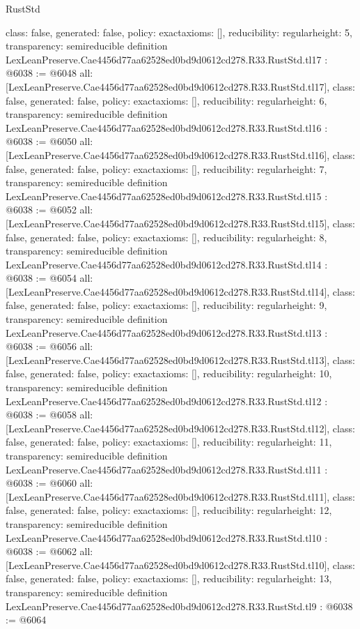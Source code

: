 \begin{lexlean}{RustStd}
\begin{coremodule}
{  class: false,
  generated: false,
  policy: exact{axioms: []},
  reducibility: regular{height: 5},
  transparency: semireducible
}
definition LexLeanPreserve.Cae4456d77aa62528ed0bd9d0612cd278.R33.RustStd.tl17 : @6038 := @6048 {
  all: [LexLeanPreserve.Cae4456d77aa62528ed0bd9d0612cd278.R33.RustStd.tl17],
  class: false,
  generated: false,
  policy: exact{axioms: []},
  reducibility: regular{height: 6},
  transparency: semireducible
}
definition LexLeanPreserve.Cae4456d77aa62528ed0bd9d0612cd278.R33.RustStd.tl16 : @6038 := @6050 {
  all: [LexLeanPreserve.Cae4456d77aa62528ed0bd9d0612cd278.R33.RustStd.tl16],
  class: false,
  generated: false,
  policy: exact{axioms: []},
  reducibility: regular{height: 7},
  transparency: semireducible
}
definition LexLeanPreserve.Cae4456d77aa62528ed0bd9d0612cd278.R33.RustStd.tl15 : @6038 := @6052 {
  all: [LexLeanPreserve.Cae4456d77aa62528ed0bd9d0612cd278.R33.RustStd.tl15],
  class: false,
  generated: false,
  policy: exact{axioms: []},
  reducibility: regular{height: 8},
  transparency: semireducible
}
definition LexLeanPreserve.Cae4456d77aa62528ed0bd9d0612cd278.R33.RustStd.tl14 : @6038 := @6054 {
  all: [LexLeanPreserve.Cae4456d77aa62528ed0bd9d0612cd278.R33.RustStd.tl14],
  class: false,
  generated: false,
  policy: exact{axioms: []},
  reducibility: regular{height: 9},
  transparency: semireducible
}
definition LexLeanPreserve.Cae4456d77aa62528ed0bd9d0612cd278.R33.RustStd.tl13 : @6038 := @6056 {
  all: [LexLeanPreserve.Cae4456d77aa62528ed0bd9d0612cd278.R33.RustStd.tl13],
  class: false,
  generated: false,
  policy: exact{axioms: []},
  reducibility: regular{height: 10},
  transparency: semireducible
}
definition LexLeanPreserve.Cae4456d77aa62528ed0bd9d0612cd278.R33.RustStd.tl12 : @6038 := @6058 {
  all: [LexLeanPreserve.Cae4456d77aa62528ed0bd9d0612cd278.R33.RustStd.tl12],
  class: false,
  generated: false,
  policy: exact{axioms: []},
  reducibility: regular{height: 11},
  transparency: semireducible
}
definition LexLeanPreserve.Cae4456d77aa62528ed0bd9d0612cd278.R33.RustStd.tl11 : @6038 := @6060 {
  all: [LexLeanPreserve.Cae4456d77aa62528ed0bd9d0612cd278.R33.RustStd.tl11],
  class: false,
  generated: false,
  policy: exact{axioms: []},
  reducibility: regular{height: 12},
  transparency: semireducible
}
definition LexLeanPreserve.Cae4456d77aa62528ed0bd9d0612cd278.R33.RustStd.tl10 : @6038 := @6062 {
  all: [LexLeanPreserve.Cae4456d77aa62528ed0bd9d0612cd278.R33.RustStd.tl10],
  class: false,
  generated: false,
  policy: exact{axioms: []},
  reducibility: regular{height: 13},
  transparency: semireducible
}
definition LexLeanPreserve.Cae4456d77aa62528ed0bd9d0612cd278.R33.RustStd.tl9 : @6038 := @6064 {
}
\end{coremodule}
\end{lexlean}
